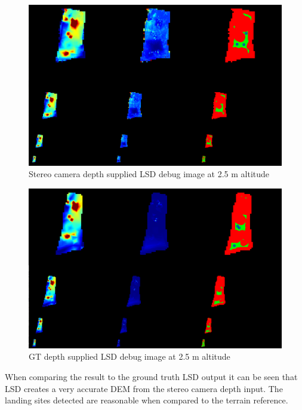 \begin{figure}[ht!]
    \centering
    \includegraphics[scale=0.25]{images/preparation/stereo_2.5m.png}
    \caption{Stereo camera depth supplied LSD debug image at 2.5 m altitude}
    \label{qual_stereo_test}
\end{figure}

\clearpage %

\begin{figure}[ht!]
    \centering
    \includegraphics[scale=0.25]{images/preparation/GT_2.5m.png}
    \caption{GT depth supplied LSD debug image at 2.5 m altitude}
    \label{stereo_GT}
\end{figure}

When comparing the result to the ground truth LSD output it can be seen that LSD creates a very accurate DEM from the stereo camera depth input. The landing sites detected are reasonable when compared to the terrain reference. 




